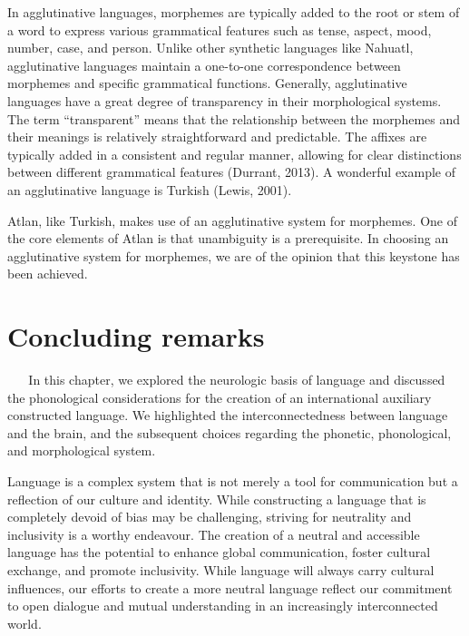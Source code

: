 In agglutinative languages, morphemes are typically added to the root or stem of a word to express various grammatical features such as tense, aspect, mood, number, case, and person. Unlike other synthetic languages like Nahuatl, agglutinative languages maintain a one-to-one correspondence between morphemes and specific grammatical functions. Generally, agglutinative languages have a great degree of transparency in their morphological systems. The term “transparent” means that the relationship between the morphemes and their meanings is relatively straightforward and predictable. The affixes are typically added in a consistent and regular manner, allowing for clear distinctions between different grammatical features (Durrant, 2013). A wonderful example of an agglutinative language is Turkish (Lewis, 2001). 

Atlan, like Turkish, makes use of an agglutinative system for morphemes. One of the core elements of Atlan is that unambiguity is a prerequisite. In choosing an agglutinative system for morphemes, we are of the opinion that this keystone has been achieved.  
  
  
\section{Concluding remarks} 
  
\noindent In this chapter, we explored the neurologic basis of language and discussed the phonological considerations for the creation of an international auxiliary constructed language. We highlighted the interconnectedness between language and the brain, and the subsequent choices regarding the phonetic, phonological, and morphological system.

Language is a complex system that is not merely a tool for communication but a reflection of our culture and identity. While constructing a language that is completely devoid of bias may be challenging, striving for neutrality and inclusivity is a worthy endeavour. The creation of a neutral and accessible language has the potential to enhance global communication, foster cultural exchange, and promote inclusivity. While language will always carry cultural influences, our efforts to create a more neutral language reflect our commitment to open dialogue and mutual understanding in an increasingly interconnected world. 

\vfill
